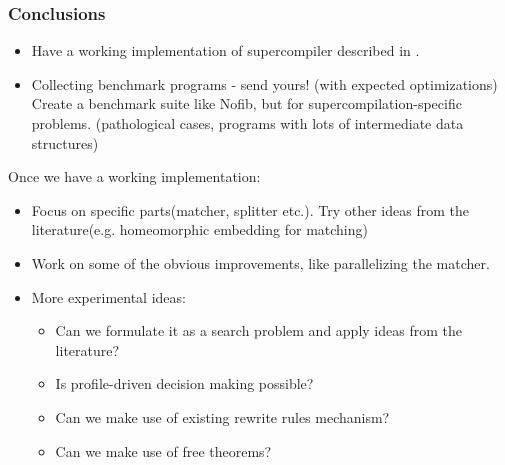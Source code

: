 \documentclass{beamer}
\begin{document}
\begin{frame}
    \frametitle{Conclusions}

    \begin{itemize}[<+->]
        \item[]
            Have a working implementation of supercompiler described in
            \citet{callbyneed-sc}.
        \item[]
            Collecting benchmark programs - send yours! (with expected
            optimizations)
            \newline
            Create a benchmark suite like Nofib, but for
            supercompilation-specific problems. (pathological cases, programs
            with lots of intermediate data structures)
    \end{itemize}
\end{frame}

\begin{frame}
    Once we have a working implementation:
    \begin{itemize}
        \item
            Focus on specific parts(matcher, splitter etc.). Try other ideas
            from the literature(e.g. homeomorphic embedding for matching)
        \item
            Work on some of the obvious improvements, like parallelizing
            the matcher.
        \item
            More experimental ideas:
            \begin{itemize}
                \item[]
                    Can we formulate it as a search problem and apply ideas from
                    the literature?
                \item[]
                    Is profile-driven decision making possible?
                \item[]
                    Can we make use of existing rewrite rules mechanism?
                \item[]
                    Can we make use of free theorems?
            \end{itemize}
    \end{itemize}
\end{frame}
\end{document}
